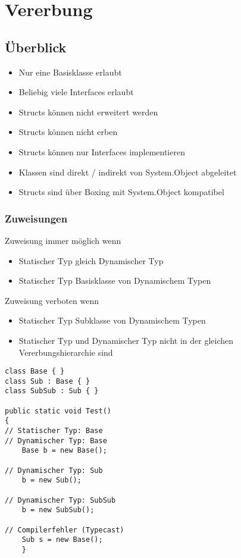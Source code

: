 
\section{Vererbung}

\subsection{Überblick}
\begin{itemize}
    \item Nur eine Basisklasse erlaubt
    \item Beliebig viele Interfaces erlaubt
    \item Structs können nicht erweitert werden
    \item Structs können nicht erben
    \item Structs können nur Interfaces implementieren
    \item Klassen sind direkt / indirekt von System.Object abgeleitet
    \item Structs sind über Boxing mit System.Object kompatibel
\end{itemize}
\subsubsection{Zuweisungen}
Zuweisung immer möglich wenn
\begin{itemize}
    \item Statischer Typ gleich Dynamischer Typ
    \item Statischer Typ Basisklasse von Dynamischem Typen
\end{itemize}
Zuweisung verboten wenn
\begin{itemize}
    \item Statischer Typ Subklasse von Dynamischem Typen
    \item Statischer Typ und Dynamischer Typ nicht in der gleichen Vererbungshierarchie sind
\end{itemize}
\begin{lstlisting}
class Base { }
class Sub : Base { }
class SubSub : Sub { }

public static void Test()
{
// Statischer Typ: Base
// Dynamischer Typ: Base
    Base b = new Base();

// Dynamischer Typ: Sub
    b = new Sub();

// Dynamischer Typ: SubSub
    b = new SubSub();

// Compilerfehler (Typecast)
    Sub s = new Base();
    }
\end{lstlisting}
